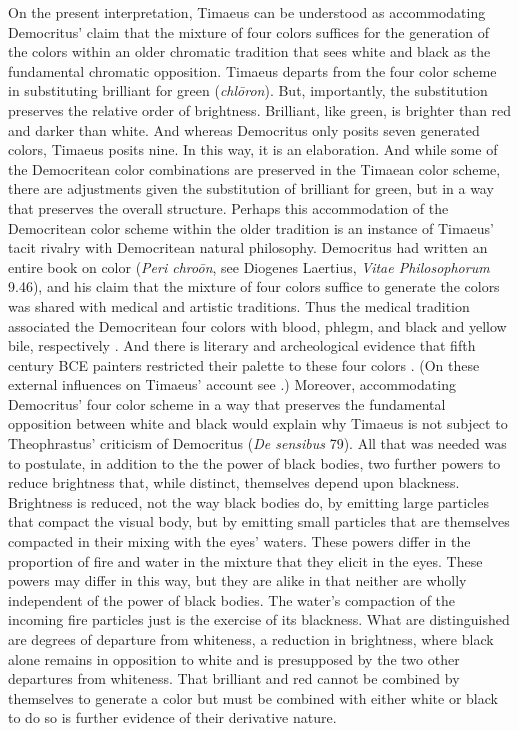 On the present interpretation, Timaeus can be understood as accommodating Democritus' claim that the mixture of four colors suffices for the generation of the colors within an older chromatic tradition that sees white and black as the fundamental chromatic opposition. Timaeus departs from the four color scheme in substituting brilliant for green  (\emph{chlōron}). But, importantly, the substitution preserves the relative order of brightness. Brilliant, like green, is brighter than red and darker than white. And whereas Democritus only posits seven generated colors, Timaeus posits nine. In this way, it is an elaboration. And while some of the Democritean color combinations are preserved in the Timaean color scheme, there are adjustments given the substitution of brilliant for green, but in a way that preserves the overall structure. Perhaps this accommodation of the Democritean color scheme within the older tradition is an instance of Timaeus' tacit rivalry with Democritean natural philosophy. Democritus had written an entire book on color (\emph{Peri chroōn}, see Diogenes Laertius, \emph{Vitae Philosophorum} 9.46), and his claim that the mixture of four colors suffice to generate the colors was shared with medical and artistic traditions. Thus the medical tradition associated the Democritean four colors with blood, phlegm, and black and yellow bile, respectively \cite[]{Longrigg:1963tt}. And there is literary and archeological evidence that fifth century BCE painters restricted their palette to these four colors \cite[56--7]{Bruno:1977fk}. (On these external influences on Timaeus' account see \citealt[127--8]{Ierodiakonou:2009cg}.) Moreover, accommodating Democritus' four color scheme in a way that preserves the fundamental opposition between white and black would explain why Timaeus is not subject to Theophrastus' criticism of Democritus (\emph{De sensibus} 79). All that was needed was to postulate, in addition to the the power of black bodies, two further powers to reduce brightness that, while distinct, themselves depend upon blackness. Brightness is reduced, not the way black bodies do, by emitting large particles that compact the visual body, but by emitting small particles that are themselves compacted in their mixing with the eyes' waters. These powers differ in the proportion of fire and water in the mixture that they elicit in the eyes. These powers may differ in this way, but they are alike in that neither are wholly independent of the power of black bodies. The water's compaction of the incoming fire particles just is the exercise of its blackness. What are distinguished are degrees of departure from whiteness, a reduction in brightness, where black alone remains in opposition to white and is presupposed by the two other departures from whiteness. That brilliant and red cannot be combined by themselves to generate a color but must be combined with either white or black to do so is further evidence of their derivative nature.

